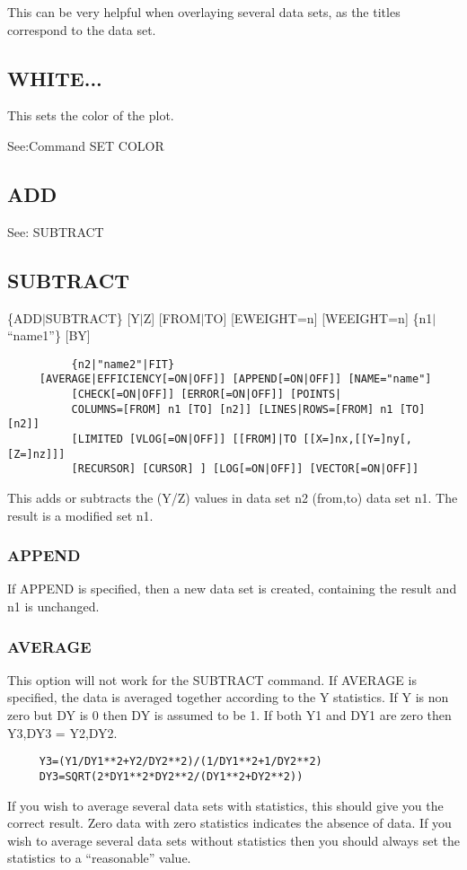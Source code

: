 This can be very helpful when overlaying several data sets, as the titles
correspond to the data set.  
\subsection{WHITE...}
This sets the color of the plot.  

See:Command SET COLOR 
\subsection{ADD}
See:  SUBTRACT 
\subsection{SUBTRACT}
\{ADD$|$SUBTRACT\} [Y$|$Z] [FROM$|$TO] [EWEIGHT=n] [WEEIGHT=n] \{n1$|$``name1''\} [BY]
\begin{verbatim}
          {n2|"name2"|FIT} 
     [AVERAGE|EFFICIENCY[=ON|OFF]] [APPEND[=ON|OFF]] [NAME="name"]
          [CHECK[=ON|OFF]] [ERROR[=ON|OFF]] [POINTS|
          COLUMNS=[FROM] n1 [TO] [n2]] [LINES|ROWS=[FROM] n1 [TO] [n2]]
          [LIMITED [VLOG[=ON|OFF]] [[FROM]|TO [[X=]nx,[[Y=]ny[,[Z=]nz]]]
          [RECURSOR] [CURSOR] ] [LOG[=ON|OFF]] [VECTOR[=ON|OFF]] 
\end{verbatim}
This adds or subtracts the (Y/Z) values in data set n2 (from,to) data set
n1.  The result is a modified set n1.  
\subsubsection{APPEND}
If  APPEND is specified, then a new data set is created, containing the
result and n1 is unchanged.  
\subsubsection{AVERAGE}
This  option  will  not  work  for the SUBTRACT command.  If AVERAGE is
specified, the data is averaged together according to the Y statistics.
If  Y  is  non zero but DY is 0 then DY is assumed to be 1.  If both Y1
and DY1 are zero then Y3,DY3 = Y2,DY2.  
\begin{verbatim}
     Y3=(Y1/DY1**2+Y2/DY2**2)/(1/DY1**2+1/DY2**2) 
     DY3=SQRT(2*DY1**2*DY2**2/(DY1**2+DY2**2)) 
\end{verbatim}
If  you  wish to average several data sets with statistics, this should
give you the correct result.  Zero data with zero statistics  indicates
the  absence of data.  If you wish to average several data sets without
statistics then you should always set the statistics to a  ``reasonable''
value.  
